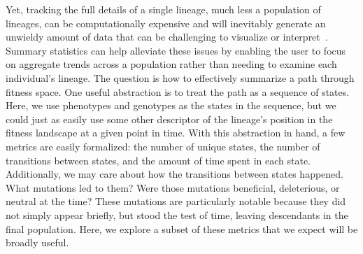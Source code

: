 \documentclass[letterpaper]{article}
\begin{document}
Yet, tracking the full details of a single lineage, much less a population of lineages, can be computationally expensive and will inevitably generate an unwieldy amount of data that can be challenging to visualize or interpret~\citep{mcphee_visualizing_2016}.
Summary statistics can help alleviate these issues by enabling the user to focus on aggregate trends across a population rather than needing to examine each individual's lineage. The question is how to effectively summarize %
a path through fitness space. One useful abstraction is to treat the path as a sequence of states. Here, we use phenotypes and genotypes as the states in the sequence, but we could just as easily use some other descriptor of the lineage's position in the fitness landscape at a given point in time.
With this abstraction in hand, a few metrics are easily formalized: the number of unique states, the number of transitions between states, and the amount of time spent in each state.
Additionally, we may care about how the transitions between states happened. What mutations led to them? Were those mutations beneficial, deleterious, or neutral at the time? These mutations are particularly notable because they did not simply appear briefly, but stood the test of time, leaving descendants in the final population.
Here, we explore a subset of these metrics that we expect will be broadly useful.
\end{document}
